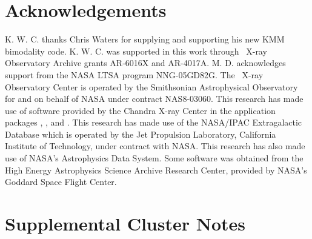 \section{Acknowledgements}

K. W. C. thanks Chris Waters for supplying and supporting his new KMM
bimodality code. K. W. C. was supported in this work through
\chandra\ X-ray Observatory Archive grants AR-6016X and
AR-4017A. M. D. acknowledges support from the NASA LTSA program
NNG-05GD82G. The \chandra\ X-ray Observatory Center is operated by the
Smithsonian Astrophysical Observatory for and on behalf of NASA under
contract NAS8-03060. This research has made use of software provided
by the Chandra X-ray Center in the application packages \ciao, \chips,
and \sherpa. This research has made use of the NASA/IPAC Extragalactic
Database which is operated by the Jet Propulsion Laboratory,
California Institute of Technology, under contract with NASA. This
research has also made use of NASA's Astrophysics Data System. Some
software was obtained from the High Energy Astrophysics Science
Archive Research Center, provided by NASA's Goddard Space Flight
Center.

\section{Supplemental Cluster Notes}
\label{sec:suppnotes}


